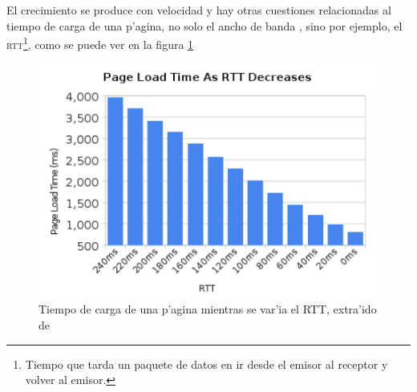 \documentclass[a4paper,11pt,twocolumn]{article}
\begin{document}
El crecimiento se produce con velocidad \cite{averageWebPage} y hay otras cuestiones relacionadas al tiempo de carga de una p'agina, no solo el ancho de banda \cite{moreBand}, sino por ejemplo, el \textsc{rtt}\footnote{Tiempo que tarda un paquete de datos en ir desde el emisor al receptor y volver al emisor.}, como se puede ver en la figura \ref{rttBelsche}

\begin{figure}[h!]
  	\centering
	\includegraphics[scale=0.5]{belsche}
	\caption{\small Tiempo de carga de una p'agina mientras se var'ia el RTT, extra'ido de \cite{moreBand}}
	\label{rttBelsche}
\end{figure}
\end{document}
